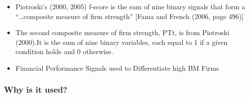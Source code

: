 \documentclass[12pt]{article}
\begin{document}
        \begin{itemize}

            \item Piotroski’s (2000, 2005) f-score is the sum of nine binary signals that form a “…composite measure of firm strength” [Fama and French (2006, page 496)] \citep{Choi2012}

            \item The second composite measure of firm strength, PTt, is from Piotroski (2000).It is the sum of nine binary variables, each equal to 1 if a given condition holds and 0 otherwise.\citep{Fama2006}

            \item Financial Performance Signals used to Differentiate high BM Firms \citep{Piotroski2000}
        
        
        \end{itemize}

    \subsubsection{Why is it used?}
\end{document}
